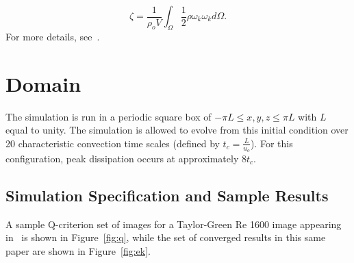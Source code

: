 \documentclass{article}
\begin{document}
\begin{equation}
\zeta = \frac{1}{\rho_o V} \int_\Omega \frac{1}{2}\rho \omega_k \omega_k d\Omega.
\end{equation}
%
For more details, see~\cite{bullAndJameson2015}.

\section{Domain}
The simulation is run in a periodic square box of $-\pi L \leq x,y,z \leq \pi L$ with $L$ equal to unity. The simulation
is allowed to evolve from this initial condition over 20 characteristic convection time scales (defined 
by $t_c = \frac{L}{u_o}$). For this configuration, peak dissipation occurs at approximately $8t_c$.

\subsection{Simulation Specification and Sample Results}
A sample Q-criterion set of images for a Taylor-Green Re 1600 image appearing in~\cite{domino2019} is shown in 
Figure~\ref{fig:q}, while the set of converged results in this same paper are shown in Figure~\ref{fig:ek}.
\end{document}
